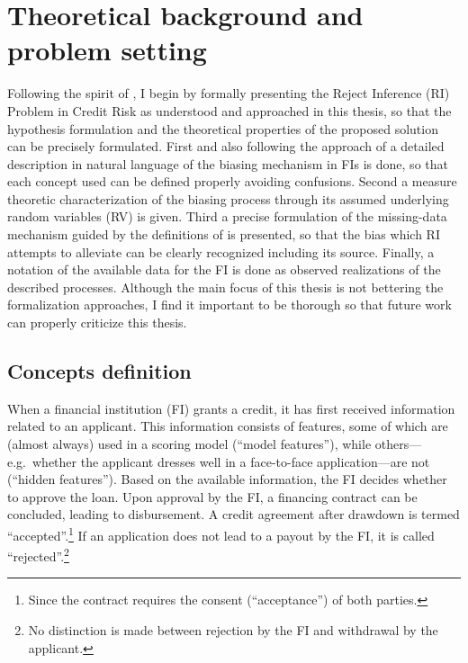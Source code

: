 \documentclass[
  12pt,
]{article}
\begin{document}
\newpage{}

\section{Theoretical background and problem
setting}\label{theoretical-background-and-problem-setting}

Following the spirit of \textcite{ehrhardt2021rejectReview}, I begin by
formally presenting the Reject Inference (RI) Problem in Credit Risk as
understood and approached in this thesis, so that the hypothesis
formulation and the theoretical properties of the proposed solution can
be precisely formulated. First and also following the approach of
\textcite{ehrhardt2021rejectReview} a detailed description in natural
language of the biasing mechanism in FIs is done, so that each concept
used can be defined properly avoiding confusions. Second a measure
theoretic characterization of the biasing process through its assumed
underlying random variables (RV) is given. Third a precise formulation
of the missing-data mechanism guided by the definitions of
\textcite{littleAndRubingAnalysisWithMissingData} is presented, so that
the bias which RI attempts to alleviate can be clearly recognized
including its source. Finally, a notation of the available data for the
FI is done as observed realizations of the described processes. Although
the main focus of this thesis is not bettering the formalization
approaches, I find it important to be thorough so that future work can
properly criticize this thesis.

\subsection{Concepts definition}\label{sec-concepts-definition}

When a financial institution (FI) grants a credit, it has first received
information related to an applicant. This information consists of
features, some of which are (almost always) used in a scoring model
(``model features''), while others---e.g.~whether the applicant dresses
well in a face-to-face application---are not (``hidden features'').
Based on the available information, the FI decides whether to approve
the loan. Upon approval by the FI, a financing contract can be
concluded, leading to disbursement. A credit agreement after drawdown is
termed ``accepted''.\footnote{Since the contract requires the consent
  (``acceptance'') of both parties.} If an application does not lead to
a payout by the FI, it is called ``rejected''.\footnote{No distinction
  is made between rejection by the FI and withdrawal by the applicant.}
\end{document}
